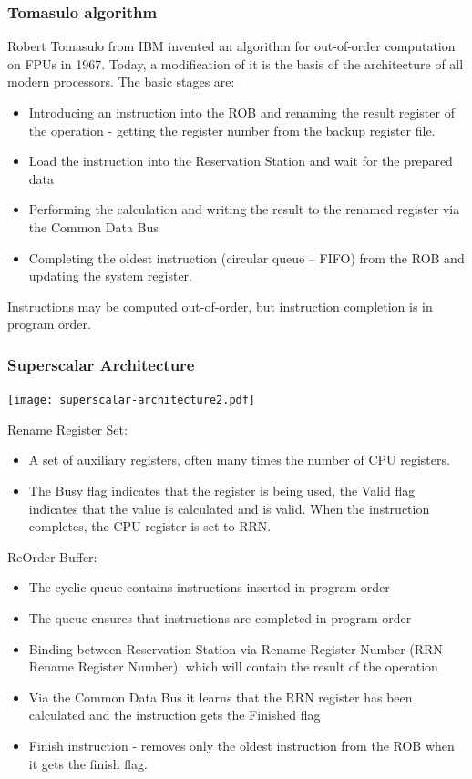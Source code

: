 \documentclass{beamer}
\begin{document}
\begin{frame}
\frametitle{Tomasulo algorithm}

Robert Tomasulo from IBM invented an algorithm for out-of-order computation on FPUs in 1967.
Today, a modification of it is the basis of the architecture of all modern processors.
The basic stages are:
\begin{itemize}
\item Introducing an instruction into the ROB and renaming the result register of the operation - getting the register number from the backup register file.
\item Load the instruction into the Reservation Station and wait for the prepared data
\item Performing the calculation and writing the result to the renamed register via the Common Data Bus
\item Completing the oldest instruction (circular queue -- FIFO) from the ROB and updating the system register.
\end{itemize}
Instructions may be computed out-of-order, but instruction completion is in program order.
\end{frame}

\begin{frame}
\frametitle{Superscalar Architecture}

\begin{center}
\texttt{[image: superscalar-architecture2.pdf]}
\end{center}

\scriptsize
Rename Register Set:
\begin{itemize}
\item A set of auxiliary registers, often many times the number of CPU registers.
\item The Busy flag indicates that the register is being used, the Valid flag indicates that the value is calculated and is valid. When the instruction completes, the CPU register is set to RRN.
\end{itemize}

ReOrder Buffer:
\begin{itemize}
\item The cyclic queue contains instructions inserted in program order
\item The queue ensures that instructions are completed in program order
\item Binding between Reservation Station via Rename Register Number (RRN Rename Register Number), which will contain the result of the operation
\item Via the Common Data Bus it learns that the RRN register has been calculated and the instruction gets the Finished flag
\item Finish instruction - removes only the oldest instruction from the ROB when it gets the finish flag.
\end{itemize}


\end{frame}
\end{document}

